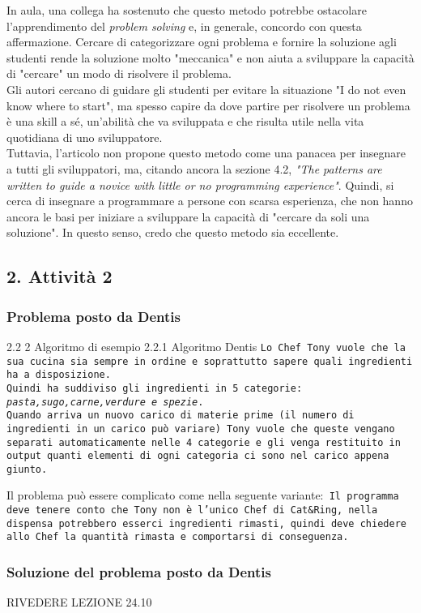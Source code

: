 \documentclass[a4paper]{article}
\begin{document}
In aula, una collega ha sostenuto che questo metodo potrebbe ostacolare l'apprendimento del \textit{problem solving} e, in generale, concordo con questa affermazione.
Cercare di categorizzare ogni problema e fornire la soluzione agli studenti rende la soluzione molto "meccanica" e non aiuta a sviluppare la capacità di "cercare" un modo di risolvere il problema.\\
Gli autori cercano di guidare gli studenti per evitare la situazione "I do not even know where to start", ma spesso capire da dove partire per risolvere un problema è una skill a sé, un'abilità che va sviluppata e che risulta utile nella vita quotidiana di uno sviluppatore.\\

Tuttavia, l'articolo non propone questo metodo come una panacea per insegnare a tutti gli sviluppatori, ma, citando ancora la sezione 4.2, \textit{"The patterns are written to guide a novice with little or no programming experience"}.
Quindi, si cerca di insegnare a programmare a persone con scarsa esperienza, che non hanno ancora le basi per iniziare a sviluppare la capacità di "cercare da soli una soluzione". In questo senso, credo che questo metodo sia eccellente.

\subsection{2. Attività 2}
\subsubsection{Problema posto da Dentis}
2.2 2 Algoritmo di esempio 2.2.1 Algoritmo Dentis
\texttt{Lo Chef Tony vuole che la sua cucina sia sempre in ordine e soprattutto sapere quali ingredienti ha a disposizione.\\Quindi ha suddiviso gli ingredienti in 5 categorie: \textit{pasta,sugo,carne,verdure e spezie}.\\ Quando arriva un nuovo carico di materie prime (il numero di ingredienti in un carico può variare) Tony vuole che queste vengano separati automaticamente nelle 4 categorie e gli venga restituito in output quanti elementi di ogni categoria ci sono nel carico appena giunto.}

Il problema può essere complicato come nella seguente variante:\texttt{ Il programma deve tenere conto che Tony non è l'unico Chef di Cat\&Ring, nella dispensa potrebbero esserci ingredienti rimasti, quindi deve chiedere allo Chef la quantità rimasta e comportarsi di conseguenza.}
\subsubsection{Soluzione del problema posto da Dentis}
RIVEDERE LEZIONE 24.10
\printbibliography
\end{document}
